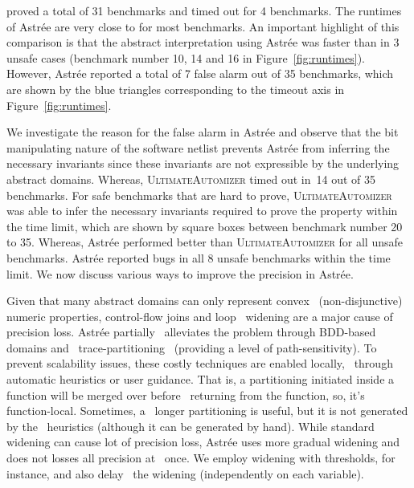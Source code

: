 \ABC proved a total of 31 benchmarks and timed out for 4 benchmarks. 
The runtimes of Astr{\'e}e are very close to \ABC for most benchmarks. 
An important highlight of this comparison is that the abstract interpretation 
using Astr{\'e}e was faster than \ABC in 3 unsafe cases (benchmark number 10, 14 and 16 
in Figure~\ref{fig:runtimes}).  
%
However, Astr{\'e}e reported a total of 7 false alarm out of 35 benchmarks,  
which are shown by the blue triangles corresponding to the timeout axis in 
Figure~\ref{fig:runtimes}.  
%

We investigate the reason for the false alarm in Astr{\'e}e and observe 
that the bit manipulating nature of the software netlist prevents Astr{\'e}e from 
inferring the necessary invariants since these invariants are not expressible by the 
underlying abstract domains.  Whereas, \textsc{UltimateAutomizer} timed out in~14 
out of 35 benchmarks. For safe benchmarks that are hard to prove, \textsc{UltimateAutomizer} 
was able to infer the necessary invariants required to prove the property within 
the time limit, which are shown by square boxes between benchmark number 20 to 35. 
Whereas, Astr{\'e}e performed better than \textsc{UltimateAutomizer} for all 
unsafe benchmarks.  Astr{\'e}e reported bugs in all 8 unsafe benchmarks within 
the time limit.  We now discuss various ways to improve the precision in Astr{\'e}e.

%
%
%
Given that many abstract domains can only represent convex  
(non-disjunctive) numeric properties, control-flow joins and loop  
widening are a major cause of precision loss.  Astr{\'e}e partially  
alleviates the problem through BDD-based domains and 
trace-partitioning~\cite{DBLP:journals/toplas/RivalM07}
(providing a level of path-sensitivity). 
To prevent scalability issues, these costly techniques are enabled locally, 
through automatic heuristics or user guidance.  That is, a partitioning 
initiated inside a function will be merged over before  
returning from the function, so, it's function-local. Sometimes, a  
longer partitioning is useful, but it is not generated by the  
heuristics (although it can be generated by hand).  While standard 
widening can cause lot of precision loss, Astr{\'e}e 
uses more gradual widening and does not losses all precision at  
once.  We employ widening with thresholds, for instance, and also delay  
the widening (independently on each variable).  


